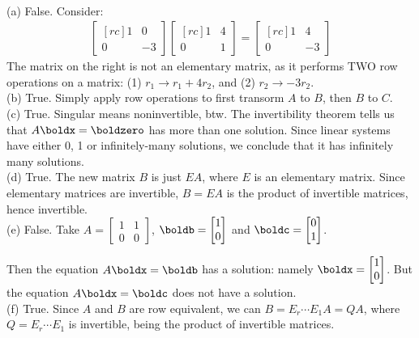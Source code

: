 \begin{solution}
\ \\
(a)
False. Consider:
\begin{eqnarray*}
\begin{bmatrix}[rc]
1&0\\
0&-3
\end{bmatrix}
\begin{bmatrix}[rc]
1&4\\
0&1
\end{bmatrix}
=
\begin{bmatrix}[rc]
1&4\\
0&-3
\end{bmatrix}
\end{eqnarray*}
The matrix on the right is not an elementary matrix, as it performs TWO row operations on a matrix: (1) $r_1\rightarrow r_1+4r_2$, and (2) $r_2\rightarrow -3r_2$.
\\
(b) True. Simply apply row operations to first transorm $A$ to $B$, then $B$ to $C$.
\\
(c) True. Singular means noninvertible, btw. The invertibility theorem tells us that $A\boldx=\boldzero$ has more than one solution. Since linear systems have either 0, 1 or infinitely-many solutions, we conclude that it has infinitely many solutions.
\\
(d) True. The new matrix $B$ is just $EA$, where $E$ is an elementary matrix. Since elementary matrices are invertible, $B=EA$ is the product of invertible matrices, hence invertible.
\\
(e) False. Take $A=\begin{bmatrix}1&1\\0&0 \end{bmatrix}$, $\boldb=\begin{bmatrix}1\\0\end{bmatrix}$ and $\boldc=\begin{bmatrix}0\\1 \end{bmatrix}$.

Then the equation $A\boldx=\boldb$ has a solution: namely $\boldx=\begin{bmatrix}1\\0\end{bmatrix}$. But the equation $A\boldx=\boldc$ does not have a solution.
\\
(f)
True.
Since $A$ and $B$ are row equivalent, we can $B = E_r \cdots E_1A=QA$, where $Q=E_r \cdots E_1$ is invertible, being the product of invertible matrices.


\end{solution}
